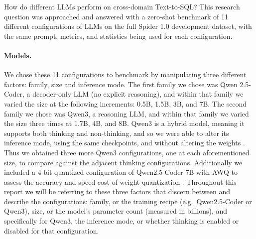 
How do different LLMs perform on cross-domain Text-to-SQL? This research question was approached and answered with a zero-shot benchmark of 11 different configurations of LLMs on the full Spider 1.0 development dataset, with the same prompt, metrics, and statistics being used for each configuration.

\paragraph{Models.}
We chose these 11 configurations to benchmark by manipulating three different factors: family, size and inference mode. The first family we chose was Qwen 2.5-Coder, a decoder-only LLM (no explicit reasoning), and within that family we varied the size at the following increments: 0.5B, 1.5B, 3B, and 7B. The second family we chose was Qwen3, a reasoning LLM, and within that family we varied the size three times at 1.7B, 4B, and 8B. Qwen3 is a hybrid model, meaning it supports both thinking and non-thinking, and so we were able to alter its inference mode, using the same checkpoints, and without altering the weights \citep{yang2025qwen3}. Thus we obtained three more Qwen3 configurations, one at each aforementioned size, to compare against the adjacent thinking configurations. Additionally we included a 4-bit quantized configuration of Qwen2.5-Coder-7B with AWQ to assess the accuracy and speed cost of weight quantization \citep{lin2024awq}. Throughout this report we will be referring to these three factors that discern between and describe the configurations: family, or the training recipe (e.g.\ Qwen2.5-Coder or Qwen3), size, or the model’s parameter count (measured in billions), and specifically for Qwen3, the inference mode, or whether thinking is enabled or disabled for that configuration.

